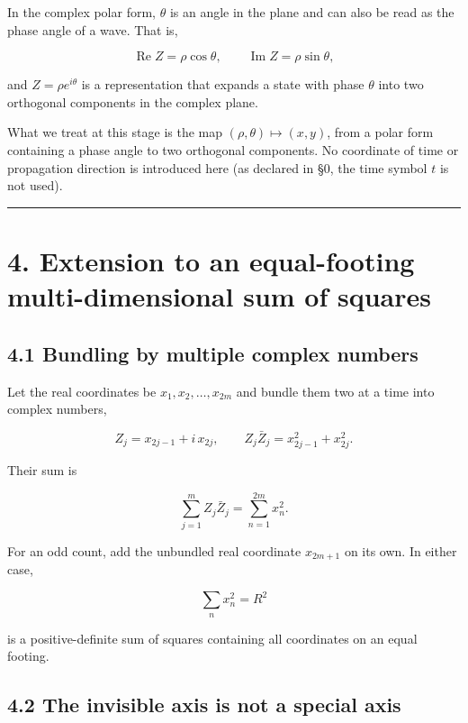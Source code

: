 \documentclass[11pt,a4paper]{article}
\begin{document}
In the complex polar form, \(\theta\) is an angle in the plane and can
also be read as the phase angle of a wave. That is,

\[
\operatorname{Re}Z=\rho\cos\theta,\qquad \operatorname{Im}Z=\rho\sin\theta,
\]

and \(Z=\rho e^{i\theta}\) is a representation that expands a state with
phase \(\theta\) into two orthogonal components in the complex plane.

What we treat at this stage is the map
\((\rho,\theta)\longmapsto(x,y)\), from a polar form containing a phase
angle to two orthogonal components. No coordinate of time or propagation
direction is introduced here (as declared in §0, the time symbol \(t\)
is not used).

\begin{center}\rule{0.5\linewidth}{0.5pt}\end{center}

\section{4. Extension to an equal-footing multi-dimensional sum of
squares}\label{extension-to-an-equal-footing-multi-dimensional-sum-of-squares}

\subsection{4.1 Bundling by multiple complex
numbers}\label{bundling-by-multiple-complex-numbers}

Let the real coordinates be \(x_1,x_2,\dots,x_{2m}\) and bundle them two
at a time into complex numbers,

\[
Z_j=x_{2j-1}+i\,x_{2j},\qquad Z_j\bar Z_j=x_{2j-1}^2+x_{2j}^2 .
\]

Their sum is

\[
\sum_{j=1}^{m} Z_j\bar Z_j=\sum_{n=1}^{2m} x_n^2 .
\]

For an odd count, add the unbundled real coordinate \(x_{2m+1}\) on its
own. In either case,

\[
\sum_n x_n^2=R^2
\]

is a positive-definite sum of squares containing all coordinates on an
equal footing.

\subsection{4.2 The invisible axis is not a special
axis}\label{the-invisible-axis-is-not-a-special-axis}
\end{document}
